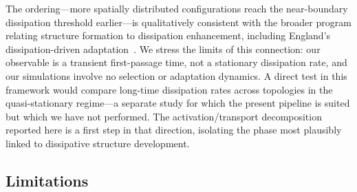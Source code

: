 \documentclass[aps,pre,preprint,superscriptaddress,nofootinbib,floatfix]{revtex4-2}
\begin{document}
The ordering---more spatially distributed configurations reach the near-boundary dissipation threshold earlier---is qualitatively consistent with the broader program relating structure formation to dissipation enhancement, including England's dissipation-driven adaptation~\cite{england2013}. We stress the limits of this connection: our observable is a transient first-passage time, not a stationary dissipation rate, and our simulations involve no selection or adaptation dynamics. A direct test in this framework would compare long-time dissipation rates across topologies in the quasi-stationary regime---a separate study for which the present pipeline is suited but which we have not performed. The activation/transport decomposition reported here is a first step in that direction, isolating the phase most plausibly linked to dissipative structure development.

\subsection{Limitations}
\end{document}
